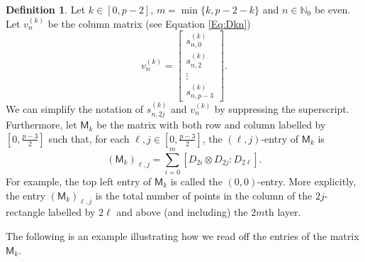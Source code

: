 \documentclass[12pt,reqno]{amsart}
\newcommand{\NN}{\mathbb{N}}
\newcommand{\M}{\mathsf{M}}
\theoremstyle{definition}
\newtheorem{defn}[thm]{Definition}
\numberwithin{equation}{section}
\begin{document}
\begin{defn}\label{D:Mvnk}
    Let $k\in [0,p-2]$, $m=\min\{k,p-2-k\}$ and $n\in\NN_0$ be even. Let $v_n^{(k)}$ be the column matrix (see Equation \ref{Eq:Dkn}) 
    \[v_n^{(k)}=\begin{bmatrix}
            s_{n,0}^{(k)}\\ s_{n,2}^{(k)}\\ \vdots\\ s_{n,p-3}^{(k)} 
    \end{bmatrix}.\] We can simplify the notation of $s_{n,2j}^{(k)}$ and $v_n^{(k)}$ by suppressing the superscript. Furthermore, let $\M_k$ be the matrix with both row and column labelled by $[0,\frac{p-3}{2}]$ such that, for each $\ell,j\in [0,\frac{p-3}{2}]$, the $(\ell,j)$-entry of $\M_k$ is \[(\M_k)_{\ell,j}=\sum_{i=0}^m[D_{2i}\otimes D_{2j}:D_{2\ell}].\] For example, the top left entry of $\M_k$ is called the $(0,0)$-entry. More explicitly, the entry $(\M_k)_{\ell,j}$ is the total number of points in the column of the $2j$-rectangle labelled by $2\ell$ and above (and including) the $2m$th layer. 
\end{defn}

The following is an example illustrating how we read off the entries of the matrix $\M_k$.
\end{document}
